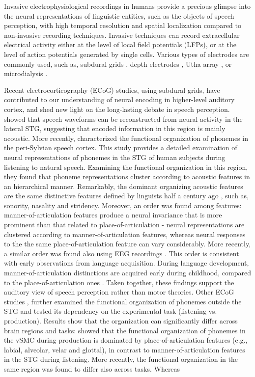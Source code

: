 Invasive electrophysiological recordings in humans provide a precious glimpse into the neural representations of linguistic entities, such as the objects of speech perception, with high temporal resolution and spatial localization compared to non-invasive recording techniques. Invasive techniques can record extracellular electrical activity either at the level of local field potentials (LFPs), or at the level of action potentials generated by single cells. Various types of electrodes are commonly used, such as, subdural grids \citep{viventi2011flexible}, depth electrodes \citep{fried1999cerebral}, Utha array \citep{nordhausen1996single}, or microdialysis \citep{fried2001increased}.

Recent electrocorticography (ECoG) studies, using subdural grids, have contributed to our understanding of neural encoding in higher-level auditory cortex, and shed new light on the long-lasting debate in speech perception. \citet{pasley2012reconstructing} showed that speech waveforms can be reconstructed from neural activity in the lateral STG, suggesting that encoded information in this region is mainly acoustic. More recently, \citet{Mesgarani2014} characterized the functional organization of phonemes in the peri-Sylvian speech cortex. This study provides a detailed examination of neural representations of phonemes in the STG of human subjects during listening to natural speech. Examining the functional organization in this region, they found that phoneme representations cluster according to acoustic features in an hierarchical manner. Remarkably, the dominant organizing acoustic features are the same distinctive features defined by linguists half a century ago \citep{ChomskyHalle1968}, such as, sonority, nasality and stridency. Moreover, an order was found among features: manner-of-articulation features produce a neural invariance that is more prominent than that related to place-of-articulation - neural representations are clustered according to manner-of-articulation features, whereas neural responses to the the same place-of-articulation feature can vary considerably. More recently, a similar order was found also using EEG recordings \citep{khalighinejad2017dynamic}. This order is consistent with early observations from language acquisition. During language development, manner-of-articulation distinctions are acquired early during childhood, compared to the place-of-articulation ones \citep{jakobson1968child, grodzinsky2014neural}. Taken together, these findings support the auditory view of speech perception rather than motor theories. Other ECoG studies \citep{bouchard2013functional, cheung2016auditory}, further examined the functional organization of phonemes outside the STG and tested its dependency on the experimental task (listening vs. production). Results show that the organization can significantly differ across brain regions and tasks: \citet{bouchard2013functional} showed that the functional organization of phonemes in the vSMC during production is dominated by place-of-articulation features (e.g., labial, alveolar, velar and glottal), in contrast to manner-of-articulation features in the STG during listening. More recently, the functional organization in the same region was found to differ also across tasks. Whereas 